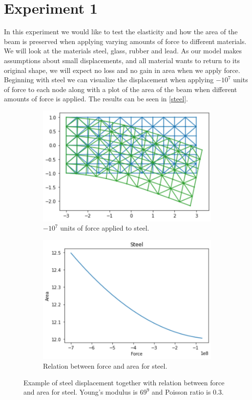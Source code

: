 \section{Experiment 1}
In this experiment we would like to test the elasticity and how the area of the beam is preserved when applying varying amounts of force to different materials. We will look at the materials steel, glass, rubber and lead. As our model makes assumptions about small displacements, and all material wants to return to its original shape, we will expect no loss and no gain in area when we apply force. Beginning with steel we can visualize the displacement when applying $-10^7$ units of force to each node along with a plot of the area of the beam when different amounts of force is applied. The results can be seen in \autoref{steel}.
\begin{figure}[H]
	\centering
	\begin{subfigure}[b]{0.49\linewidth}
		\centering
		\includegraphics[width=\linewidth]{Materials/Steelviz}
		\caption{$-10^7$ units of force applied to steel.\\\hfill}
	\end{subfigure}
	\hfill
	\begin{subfigure}[b]{0.49\linewidth}
		\centering
		\includegraphics[width=\linewidth]{Materials/SteelArea}
		\caption{Relation between force and area for steel.}
	\end{subfigure}
	\caption{Example of steel displacement together with relation between force and area for steel. Young's modulus is $69^9$ and Poisson ratio is $0.3$.}
	\label{steel}
\end{figure}

